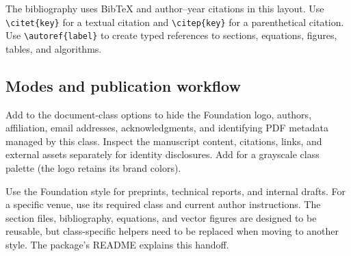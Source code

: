 The bibliography uses BibTeX and author--year citations in this layout.
Use \verb|\citet{key}| for a textual citation and \verb|\citep{key}| for a
parenthetical citation. Use \verb|\autoref{label}| to create typed references
to sections, equations, figures, tables, and algorithms.

\subsection{Modes and publication workflow}
Add  to the document-class options to hide the Foundation logo,
authors, affiliation, email addresses, acknowledgments, and identifying
PDF metadata managed by this class. Inspect the manuscript content,
citations, links, and external assets separately for identity disclosures.
Add  for a grayscale class palette (the logo retains its brand colors).

Use the Foundation style for preprints, technical reports, and internal drafts.
For a specific venue, use its required class and current author instructions.
The section files, bibliography, equations, and vector figures are designed
to be reusable, but class-specific helpers need to be replaced when moving
to another style. The package's README explains this handoff.
